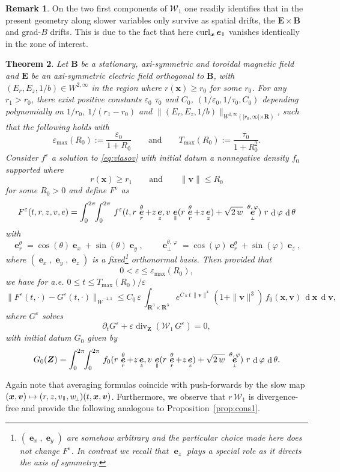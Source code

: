 \documentclass[10pt]{amsart}
\let\mathcal\mathscr
\newcommand\mto{\mathchoice{\longmapsto}{\mapsto}{\mapsto}{\mapsto}}
\newcommand{\sperp}{{\scriptscriptstyle\perp}}
\let\eps\varepsilon
\let\d\partial
\DeclareMathOperator\dD{d}\let\dd\dD
\DeclareMathOperator{\Div}{div}
\DeclareMathOperator{\Curl}{curl}
\theoremstyle{plain}
\newtheorem{theorem}{Theorem}[section]
\theoremstyle{definition}
\newtheorem{remark}[theorem]{Remark}
\newcommand\br{\begin{remark}}
\newcommand\er{\end{remark}}
\newcommand{\be}{\begin{equation}}
\newcommand{\ee}{\end{equation}}
\newcommand{\bt}{\begin{theorem}}
\newcommand{\et}{\end{theorem}}
\newcommand\R{\mathbf R}
\newcommand\bB{{\boldsymbol B}}
\newcommand\bE{{\boldsymbol E}}
\newcommand\bfv{{\boldsymbol v}}
\newcommand\bfx{{\boldsymbol x}}
\newcommand\bfZ{{\boldsymbol Z}}
\newcommand\cW{{\mathcal W}}
\DeclareMathOperator{\beD}{\boldsymbol{e}}
\newcommand\eDx{\beD_x}
\newcommand\eDy{\beD_y}
\newcommand\eDr{\beD_r}
\newcommand\eDz{\beD_z}
\newcommand\eDpar{\beD_\mypar}
\newcommand\eDperp{\beD_\sperp}
\newcommand\vpar{v_\mypar}
\newcommand\eperp{w_{\!\sperp}}
\let\e w
\newcommand\Er{E_r}
\newcommand\Ez{E_z}
\newcommand{\mypar}{{\mkern3mu\vphantom{\perp}\vrule depth 0pt\mkern2mu\vrule depth 0pt\mkern3mu}}
\begin{document}
\br
On the two first components of $\cW_1$ one readily identifies that in the present geometry along slower variables only survive as spatial drifts, the $\bE\times \bB$ and grad-$B$ drifts. This is due to the fact that here $\Curl_\bfx \eDpar$ vanishes identically in the zone of interest.
\er

\bt
\label{th:3}
Let $\bB$ be a stationary, axi-symmetric and toroidal magnetic field and $\bE$ be
an axi-symmetric electric field orthogonal to $\bB$, with $(\Er,\Ez,1/b)\in
W^{2,\infty}$ in the region where $r(\bfx)\geq r_0$ for some
$r_0$. For any $r_1>r_0$, there exist positive constants $\eps_0$ $\tau_0$ and $C_0$, $(1/\eps_0,1/\tau_0,C_0)$ depending polynomially on $1/r_0$, $1/(r_1-r_0)$ and $\|(\Er,\Ez,1/b)\|_{W^{2,\infty}([r_0,\infty[\times\R)}$, such that the following holds with
\[
\eps_{\max}(R_0):=\frac{\eps_0}{1+R_0}\qquad\textrm{and}\qquad
T_{\max}(R_0):=\frac{\tau_0}{1+R_0^2}.
\]
Consider $f^\eps$ a solution to \eqref{eq:vlasov} with initial datum a nonnegative density $f_0$ supported where\vspace*{-3pt}
\[
r(\bfx)\geq r_1\qquad\textrm{and}\qquad \|\bfv\|\leq R_0
\]
for some $R_0>0$ and define $F^\eps$ as
\[
F^\eps(t,r,z,v,e)=\int_0^{2\pi}\!\!\int_0^{2\pi}
\,f^\eps(t,r\,\eDr^\theta+z\eDz,
v\,\eDpar(r\,\eDr^\theta+z\eDz)
+\sqrt{2\,\e}\ \eDperp^{\theta,\,\varphi})\ r\,\dD\varphi\,\dD\theta
\]
with
\[
\eDr^\theta=\cos(\theta)\eDx+\sin(\theta)\eDy,\qquad
\eDperp^{\theta,\,\varphi}=\cos(\varphi)\eDr^\theta+\sin(\varphi)\eDz,
\]
where $(\eDx,\eDy,\eDz)$ is a fixed\footnote{$(\eDx,\eDy)$ are somehow arbitrary and the particular choice made here does not change $F^\eps$. In contrast we recall that $\eDz$ plays a special role as it directs the axis of symmetry.} orthonormal basis. Then provided that
\[
0<\eps\leq \eps_{\max}(R_0),
\]
we have for a.e. $0\leq t \leq T_{\max}(R_0)/\eps$
\[
\|F^\eps(t,\cdot)-G^\eps(t,\cdot)\|_{\dot{W}^{-1,1}}\leq C_0\,\eps\,
\int_{\R^3\times\R^3} e^{C\,\eps\,t\,\|\bfv\|^4}\,(1+\|\bfv\|^3)\,f_0(\bfx,\bfv)\,\dD\bfx\,\dD\bfv,
\]
where $G^\eps$ solves
\be\label{eq:axi}
\d_t G^\eps+\eps\Div_{\bfZ} \left(\cW_1\, G^\eps\right)
=0,
\ee
with initial datum $G_0$ given by
\[
G_0(\bfZ)=
\int_0^{2\pi}\!\!\int_0^{2\pi}
\,f_0(r\,\eDr^\theta+z\eDz,
v\,\eDpar(r\,\eDr^\theta+z\eDz)
+\sqrt{2\,\e}\ \eDperp^{\theta,\,\varphi})\ r\,\dD \varphi\,\dD\theta.
\]
\et

Again note that averaging formulas coincide with push-forwards by the
slow map $(\bfx,\bfv)\mto (r,z,\vpar,\eperp)(t,\bfx,\bfv)$. Furthermore, we observe that $r\,\cW_1$ is divergence-free and provide the following analogous to Proposition~\ref{prop:cons1}.
\end{document}
